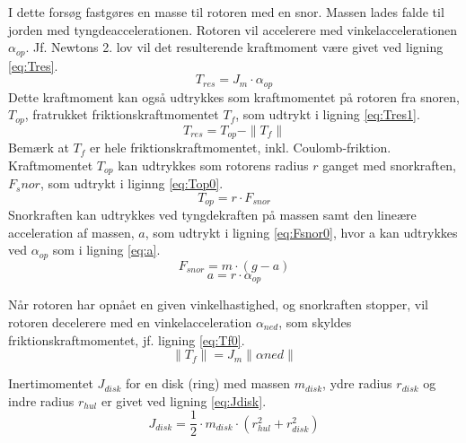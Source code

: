 I dette forsøg fastgøres en masse til rotoren med en snor.
Massen lades falde til jorden med tyngdeaccelerationen.
Rotoren vil accelerere med vinkelaccelerationen $\alpha_{op}$.
Jf. Newtons 2. lov vil det resulterende kraftmoment være givet ved ligning \ref{eq:Tres}.
\begin{equation}
	T_{res}=J_m\cdot\alpha_{op}
	\label{eq:Tres0}
 \end{equation}
Dette kraftmoment kan også udtrykkes som kraftmomentet på rotoren fra snoren, $T_{op}$,
fratrukket friktionskraftmomentet $T_f$, som udtrykt i ligning \ref{eq:Tres1}.
\begin{equation}
	T_{res}=T_{op}-\|T_f\|
	\label{eq:Tres1}
 \end{equation}
Bemærk at $T_f$ er hele friktionskraftmomentet, inkl. Coulomb-friktion.
Kraftmomentet $T_{op}$ kan udtrykkes som rotorens radius $r$ ganget med snorkraften, $F_snor$,
som udtrykt i liginng \ref{eq:Top0}.
\begin{equation}
	T_{op}=r\cdot{F_{snor}}
	\label{eq:Top0}
 \end{equation}
Snorkraften kan udtrykkes ved tyngdekraften på massen samt den lineære acceleration af massen, $a$,
som udtrykt i ligning \ref{eq:Fsnor0}, hvor a kan udtrykkes ved $\alpha_{op}$ som i ligning \ref{eq:a}.
\begin{equation}
	F_{snor}=m\cdot(g-a)
	\label{eq:Fsnor0}
 \end{equation}
\begin{equation}
	a=r\cdot\alpha_{op}
	\label{eq:a}
 \end{equation}

Når rotoren har opnået en given vinkelhastighed, og snorkraften stopper,
vil rotoren decelerere med en vinkelacceleration $\alpha_{ned}$, som skyldes friktionskraftmomentet,
jf. ligning \ref{eq:Tf0}.
\begin{equation}
	\|T_f\|=J_m\|\alpha{ned}\|
	\label{eq:Tf0}
 \end{equation}

Inertimomentet $J_{disk}$ for en disk (ring) med massen $m_{disk}$, ydre radius $r_{disk}$ og
indre radius $r_{hul}$ er givet ved ligning \ref{eq:Jdisk}.
\begin{equation}
	J_{disk}=\frac{1}{2}\cdot{m_{disk}}\cdot\left(r_{hul}^2+r_{disk}^2\right)
	\label{eq:Jdisk}
 \end{equation}

